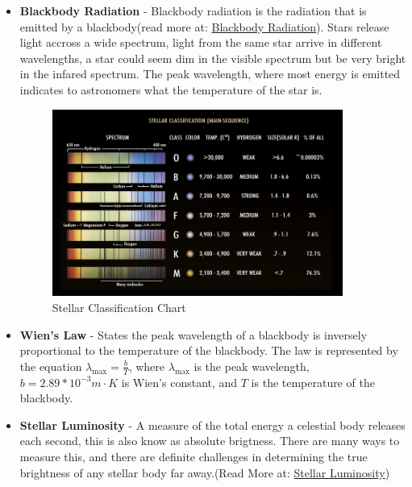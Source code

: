 \documentclass[12pt,oneside,a4paper,english]{article}
\begin{document}
\begin{itemize}
    \item  \textbf{Blackbody Radiation} - Blackbody radiation is the radiation that is emitted by a blackbody(read more at: \href{https://phys.libretexts.org/Bookshelves/University_Physics/University_Physics_(OpenStax)/University_Physics_III_-_Optics_and_Modern_Physics_(OpenStax)/06%3A_Photons_and_Matter_Waves/6.02%3A_Blackbody_Radiation}{Blackbody Radiation}). Stars release light accross a wide spectrum, light from the same star arrive in different wavelengths, a star could seem dim in the visible spectrum but be very bright in the infared spectrum. The peak wavelength, where most energy is emitted indicates to astronomers what the temperature of the star is.
    \begin{figure}[H]
        \centering
        \includegraphics[width=0.9\textwidth]{StellarClassification.png}
        \caption{Stellar Classification Chart \cite{stellerclass}}
        \label{fig:stellarclass}
    \end{figure}
    \item \textbf{Wien's Law} - States the peak wavelength of a blackbody is inversely proportional to the temperature of the blackbody. The law is represented by the equation $\lambda_{\text{max}} = \frac{b}{T}$, where $\lambda_{\text{max}}$ is the peak wavelength, $b=2.89*10^{-3} m \cdot K$ is Wien's constant, and $T$ is the temperature of the blackbody.
    \item \textbf{Stellar Luminosity} - A measure of the total energy a celestial body releases each second, this is also know as absolute brigtness. There are many ways to measure this, and there are definite challenges in determining the true brightness of any stellar body far away.(Read More at: \href{https://www.teachastronomy.com/textbook/Properties-of-Stars/Stellar-Luminosity/}{Stellar Luminosity})
\end{itemize}
\end{document}
